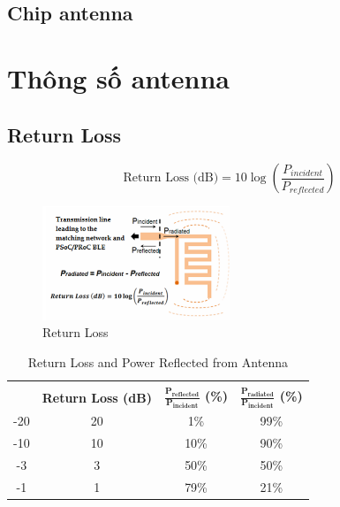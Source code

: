         \subsection{Chip antenna}

    \section{Thông số antenna}
        \subsection{Return Loss}
            \begin{equation}
                \text{Return Loss (dB)} = 10\log\left(\frac{P_{incident}}{P_{reflected}}\right)
            \end{equation}    

            \begin{figure}[h]
                \centering
                \includegraphics[width=0.5\textwidth]{figures/return_loss_antenna.png}
                \caption{Return Loss}
                \label{fig:return_loss_antenna}
            \end{figure}

            \begin{table}[h]
                \centering
                \begin{tabular}{|c|c|c|c|}
                    \hline
                    \rowcolor{TLgreen!50}
                    &   &   &   \\
                    \arrayrulecolor{TLgreen!50}
                    \cline{1-4}
                    \arrayrulecolor{black}
                    \multirow{-2}{*}{\cellcolor{TLgreen!50}$\mathbf{S_{11}}$}  &   \multirow{-2}{*}{\cellcolor{TLgreen!50}\textbf{Return Loss (dB)}}  &   \multirow{-2}{*}{\cellcolor{TLgreen!50}\textbf{$\mathbf{\frac{P_{reflected}}{P_{incident}}}$ (\%)}}    &   \multirow{-2}{*}{\cellcolor{TLgreen!50}\textbf{$\mathbf{\frac{P_{radiated}}{P_{incident}}}$ (\%)}} \\\hline
                    -20 &   20 &   1\%  &   99\% \\\hline
                    -10 &   10 &   10\% &   90\% \\\hline
                    -3  &   3  &   50\% &   50\% \\\hline
                    -1  &   1  &   79\% &   21\% \\\hline
                \end{tabular}
                \caption{Return Loss and Power Reflected from Antenna}
                \label{tab:return_loss_antenna}
            \end{table}

